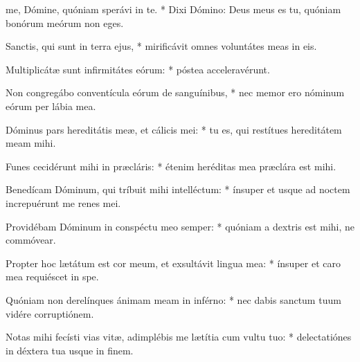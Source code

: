 \begin{psalmus}

     me, Dómine, quóniam sperávi in te. * Dixi Dómino: Deus meus es tu, quóniam bonórum meórum non eges.

    Sanctis, qui sunt in terra ejus, * mirificávit omnes voluntátes meas in eis.

    Multiplicátæ sunt infirmitátes eórum: * póstea acceleravérunt.

    Non congregábo conventícula eórum de sanguínibus, * nec memor ero nóminum eórum per lábia mea.

    Dóminus pars hereditátis meæ, et cálicis mei: * tu es, qui restítues hereditátem meam mihi.

    Funes cecidérunt mihi in præcláris: * étenim heréditas mea præclára est mihi.

    Benedícam Dóminum, qui tríbuit mihi intelléctum: * ínsuper et usque ad noctem increpuérunt me renes mei.

    Providébam Dóminum in conspéctu meo semper: * quóniam a dextris est mihi, ne commóvear.

    Propter hoc lætátum est cor meum, et exsultávit lingua mea: * ínsuper et caro mea requiéscet in spe.

    Quóniam non derelínques ánimam meam in inférno: * nec dabis sanctum tuum vidére corruptiónem.

    Notas mihi fecísti vias vitæ, adimplébis me lætítia cum vultu tuo: * delectatiónes in déxtera tua usque in finem.

\end{psalmus}
